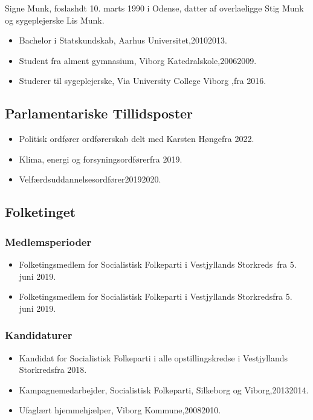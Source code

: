 \documentclass[11pt, a4paper]{awesome-cv}
\begin{document}
\makecvheader[R]
\makelettertitle
\begin{cvletter}
Signe Munk, foslashdt 10. marts 1990 i Odense, datter af overlaeligge Stig Munk og sygeplejerske Lis Munk.

\begin{itemize}
\item Bachelor i Statskundskab, Aarhus Universitet,20102013.
\item Student fra alment gymnasium, Viborg Katedralskole,20062009.
\item Studerer til sygeplejerske, Via University College Viborg ,fra 2016.
\end{itemize}
\subsection*{Parlamentariske Tillidsposter}
\begin{itemize}
\item Politisk ordfører ordførerskab delt med Karsten Høngefra 2022.
\item Klima, energi og forsyningsordførerfra 2019.
\item Velfærdsuddannelsesordfører20192020.
\end{itemize}
\subsection*{Folketinget}
\subsubsection*{Medlemsperioder}
\begin{itemize}
\item Folketingsmedlem for Socialistisk Folkeparti i Vestjyllands Storkreds fra 5. juni 2019.
\item Folketingsmedlem for Socialistisk Folkeparti i Vestjyllands Storkredsfra 5. juni 2019.
\end{itemize}
\subsubsection*{Kandidaturer}
\begin{itemize}
\item Kandidat for Socialistisk Folkeparti i alle opstillingskredse i Vestjyllands Storkredsfra 2018.
\end{itemize}
\begin{itemize}
\item Kampagnemedarbejder, Socialistisk Folkeparti, Silkeborg og Viborg,20132014.
\item Ufaglært hjemmehjælper, Viborg Kommune,20082010.
\end{itemize}
\end{cvletter}
\end{document}

